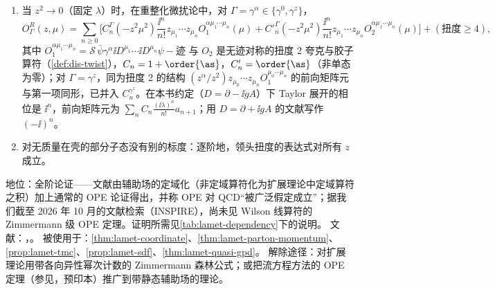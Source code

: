 \begin{assumption}\label{asm:lamet-ope}
\begin{enumerate}[label=(OP\arabic*),leftmargin=3.2em,itemsep=1pt,topsep=2pt]
\item 当 $z^2\to0$（固定 $\lambda$）时，在重整化微扰论中，对 $\Gamma=\gamma^\alpha\in\{\gamma^0,\gamma^z\}$，
\begin{equation}\label{eq:lamet-ope}
O^R_{\Gamma}(z,\mu)=\sum_{n\ge0}\Big[C^\Gamma_n(-z^2\mu^2)\frac{\ii^n}{n!}z_{\mu_1}\cdots z_{\mu_n}O_1^{\alpha\mu_1\cdots\mu_n}(\mu)+C'^\Gamma_n(-z^2\mu^2)\frac{\ii^n}{n!}z_{\mu_1}\cdots z_{\mu_n}O_2^{\alpha\mu_1\cdots\mu_n}(\mu)\Big]+(\text{扭度}\ge4),
\end{equation}
其中 $O_1^{\alpha\mu_1\cdots\mu_n}=\mathcal S\,\bar\psi\gamma^\alpha\ii D^{\mu_1}\cdots\ii D^{\mu_n}\psi-\text{迹}$ 与 $O_2$ 是无迹对称的扭度 2 夸克与胶子算符（\cref{def:dis-twist}），$C_n=1+\order{\as}$，$C'_n=\order{\as}$（非单态为零）；对 $\Gamma=\gamma^z$，同为扭度 2 的结构 $(z^\alpha/z^2)z_{\mu_0}\cdots z_{\mu_n}O_1^{\mu_0\cdots\mu_n}$ 的前向矩阵元与第一项同形，已并入 $C^{\gamma^z}_n$。在本书约定（$D=\partial-\ii gA$）下 Taylor 展开的相位是 $\ii^n$，前向矩阵元为 $\sum_nC_n\frac{(\ii\lambda)^n}{n!}a_{n+1}$；用 $D=\partial+\ii gA$ 的文献写作 $(-\ii)^n$。
\item 对无质量在壳的部分子态没有别的标度：逐阶地，领头扭度的表达式对所有 $z$ 成立。
\end{enumerate}
地位：全阶论证——文献\cite[第~II~节]{IzubuchiEtAl2018}由辅助场的定域化（非定域算符化为扩展理论中定域算符之积）加上通常的 OPE 论证得出，并称 OPE 对 QCD“被广泛假定成立”；据我们截至 2026 年 10 月的文献检索（INSPIRE），尚未见 Wilson 线算符的 Zimmermann 级 OPE 定理。证明所需见\cref{tab:lamet-dependency}下的说明。
文献：\cite[第~II~节]{IzubuchiEtAl2018}，\cite{Radyushkin2017,Braun:2007wv,Ji:2017oey}。
被使用于：\cref{thm:lamet-coordinate}、\cref{thm:lamet-parton-momentum}、\cref{prop:lamet-tmc}、\cref{prop:lamet-sdf}、\cref{thm:lamet-quasi-gpd}。
解除途径：对扩展理论用带各向异性幂次计数的 Zimmermann 森林公式；或把流方程方法的 OPE 定理（参见\cite{Frob:2016mzv}，预印本）推广到带静态辅助场的理论。
\end{assumption}

